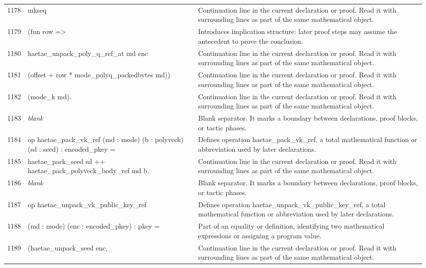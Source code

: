 \documentclass[10pt]{article}
\begin{document}
\begin{longtable}{r L{0.53\textwidth} L{0.37\textwidth}}
1178 & {\ttfamily\scriptsize   mkseq} & Continuation line in the current declaration or proof.  Read it with surrounding lines as part of the same mathematical object. \\
1179 & {\ttfamily\scriptsize     (fun row =>} & Introduces implication structure: later proof steps may assume the antecedent to prove the conclusion. \\
1180 & {\ttfamily\scriptsize       haetae\_unpack\_poly\_q\_ref\_at md enc} & Continuation line in the current declaration or proof.  Read it with surrounding lines as part of the same mathematical object. \\
1181 & {\ttfamily\scriptsize         (offset + row * mode\_polyq\_packedbytes md))} & Continuation line in the current declaration or proof.  Read it with surrounding lines as part of the same mathematical object. \\
1182 & {\ttfamily\scriptsize     (mode\_k md).} & Continuation line in the current declaration or proof.  Read it with surrounding lines as part of the same mathematical object. \\
1183 & {\ttfamily\scriptsize \emph{blank}} & Blank separator.  It marks a boundary between declarations, proof blocks, or tactic phases. \\
1184 & {\ttfamily\scriptsize op haetae\_pack\_vk\_ref (md : mode) (b : polyveck) (sd : seed) : encoded\_pkey =} & Defines operation haetae\_pack\_vk\_ref, a total mathematical function or abbreviation used by later declarations. \\
1185 & {\ttfamily\scriptsize   haetae\_pack\_seed sd ++ haetae\_pack\_polyveck\_body\_ref md b.} & Continuation line in the current declaration or proof.  Read it with surrounding lines as part of the same mathematical object. \\
1186 & {\ttfamily\scriptsize \emph{blank}} & Blank separator.  It marks a boundary between declarations, proof blocks, or tactic phases. \\
1187 & {\ttfamily\scriptsize op haetae\_unpack\_vk\_public\_key\_ref} & Defines operation haetae\_unpack\_vk\_public\_key\_ref, a total mathematical function or abbreviation used by later declarations. \\
1188 & {\ttfamily\scriptsize    (md : mode) (enc : encoded\_pkey) : pkey =} & Part of an equality or definition, identifying two mathematical expressions or assigning a program value. \\
1189 & {\ttfamily\scriptsize   (haetae\_unpack\_seed enc,} & Continuation line in the current declaration or proof.  Read it with surrounding lines as part of the same mathematical object. \\

\end{longtable}
\end{document}
